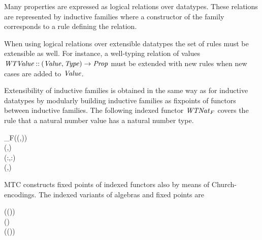 Many properties are expressed as logical relations over
datatypes. These relations are represented by inductive families where
a constructor of the family corresponds to a rule defining the
relation.

When using logical relations over extensible datatypes the set of
rules must be extensible as well. For instance, a well-typing relation
of values \ensuremath{\Conid{WTValue}\mathbin{::}(\Conid{Value},\Conid{Type})\to \Conid{Prop}} must be extended with new
rules when new cases are added to \ensuremath{\Conid{Value}}.

Extensibility of inductive families is obtained in the same way as for
inductive datatypes by modularly building inductive families as
fixpoints of functors between inductive families. The following
indexed functor \ensuremath{\Varid{WTNat}_F} covers the rule that a natural number value
has a natural number type.
\begin{hscode}\SaveRestoreHook
{}%
%
%
%
%
%
\>[3]{}\;_F\;(\mathbin{::}(\;,\;)\to {})\mathbin{::}{}\<[E]%
\\
\>[3]{}\<[11]%
\>[11]{}(,)\to {}\;\<[E]%
\\
\>[3]{}\<[5]%
\>[5]{}\mathbin{::}(\prec:,\prec:)\Rightarrow {}\<[E]%
\\
\>[5]{}\<[14]%
\>[14]{}\;\;(\;,){}\<[E]%
\ColumnHook
\end{hscode}\resethooks
MTC constructs fixed points of indexed functors also by means of
Church-encodings. The indexed variants of algebras and fixed points
are
\begin{hscode}\SaveRestoreHook
{}%
%
%
%
\>[3]{}\;\;\;(\mathbin{::}(\to {})\to {}\to {})\;\mathrel{=}{}\<[E]%
\\
\>[3]{}\<[6]%
\>[6]{}\forall (\mathbin{::})\hsforall {}\;\;\to {}\;\<[E]%
\\
\>[3]{}\;\;\;(\mathbin{::}(\to {})\to {}\to {})\;\mathrel{=}{}\<[E]%
\\
\>[3]{}\<[6]%
\>[6]{}\forall {}\hsforall {}\;\;\;\to {}\;\<[E]%
\ColumnHook
\end{hscode}\resethooks

